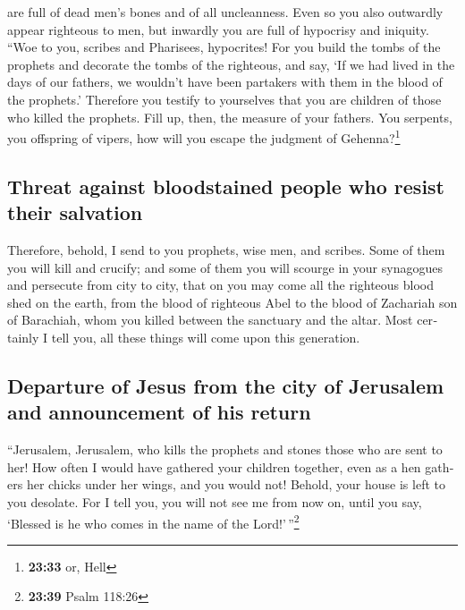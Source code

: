 \begin{paracol}{2}
\begin{otherlanguage}{english}
are full of dead men's bones and of all uncleanness. 
Even so you also outwardly appear righteous to men, but inwardly you are
full of hypocrisy and iniquity.  ``Woe to you, scribes
and Pharisees, hypocrites! For you build the tombs of the prophets and
decorate the tombs of the righteous,  and say, `If we had
lived in the days of our fathers, we wouldn't have been partakers with
them in the blood of the prophets.'  Therefore you
testify to yourselves that you are children of those who killed the
prophets.  Fill up, then, the measure of your fathers.
 You serpents, you offspring of vipers, how will you
escape the judgment of Gehenna?\footnote{\textbf{23:33} or, Hell}

\hypertarget{threat-against-bloodstained-people-who-resist-their-salvation}{%
\subsection{Threat against bloodstained people who resist their
salvation}\label{threat-against-bloodstained-people-who-resist-their-salvation}}

 Therefore, behold, I send to you prophets, wise men, and
scribes. Some of them you will kill and crucify; and some of them you
will scourge in your synagogues and persecute from city to city,
 that on you may come all the righteous blood shed on the
earth, from the blood of righteous Abel to the blood of Zachariah son of
Barachiah, whom you killed between the sanctuary and the altar.
 Most certainly I tell you, all these things will come
upon this generation.

\hypertarget{departure-of-jesus-from-the-city-of-jerusalem-and-announcement-of-his-return}{%
\subsection{Departure of Jesus from the city of Jerusalem and
announcement of his
return}\label{departure-of-jesus-from-the-city-of-jerusalem-and-announcement-of-his-return}}

 ``Jerusalem, Jerusalem, who kills the prophets and
stones those who are sent to her! How often I would have gathered your
children together, even as a hen gathers her chicks under her wings, and
you would not!  Behold, your house is left to you
desolate.  For I tell you, you will not see me from now
on, until you say, `Blessed is he who comes in the name of the
Lord!'\,''\footnote{\textbf{23:39} Psalm 118:26}


\end{otherlanguage}
\end{paracol}
